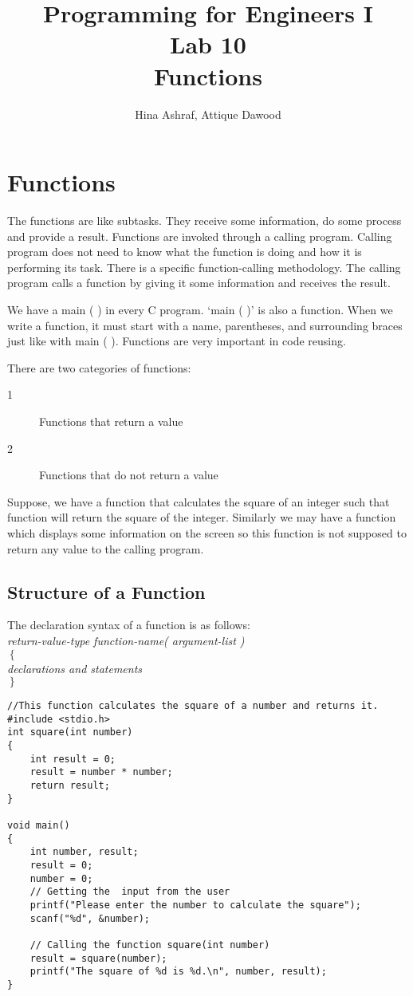 \documentclass{article}
\title{Programming for Engineers I\\Lab 10\\Functions}
\author{Hina Ashraf, Attique Dawood}
\begin{document}
\maketitle


\section{Functions}
The functions are like subtasks. They receive some information, do some process and provide a result. Functions are invoked through a calling program. Calling program does not need to know what the function is doing and how it is performing its task. There is a specific function-calling methodology. The calling program calls a function by giving it some information and receives the result.

We have a main ( ) in every C program. ‘main ( )’ is also a function. When we write a function, it must start with a name, parentheses, and surrounding braces just like with main ( ). Functions are very important in code reusing.

There are two categories of functions:

\begin{description}
\item [1]Functions that return a value
\item [2]Functions that do not return a value
\end{description}

Suppose, we have a function that calculates the square of an integer such that function will return the square of the integer. Similarly we may have a function which displays some information on the screen so this function is not supposed to return any value to the calling program.
\subsection{Structure of a Function}
The declaration syntax of a function is as follows:\\[0.3cm]
\textit{return-value-type    function-name( argument-list )\\
$\left\lbrace\right.$\\
\hspace{1cm}declarations and statements\\
$\left.\right\rbrace$}

\begin{verbatim}
//This function calculates the square of a number and returns it.
#include <stdio.h>
int square(int number)
{
    int result = 0;
    result = number * number;
    return result;
}

void main()
{
    int number, result;
    result = 0;
    number = 0;
    // Getting the  input from the user
    printf("Please enter the number to calculate the square");
    scanf("%d", &number);

    // Calling the function square(int number)
    result = square(number);
    printf("The square of %d is %d.\n", number, result);
}
\end{verbatim}
\end{document}
